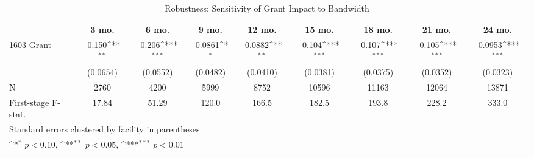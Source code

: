 \begin{table}[htbp]\centering
\def\sym#1{\ifmmode^{#1}\else\(^{#1}\)\fi}
\caption{Robustness: Sensitivity of Grant Impact to Bandwidth\label{RDD:loggenbandwidth}}
\begin{tabular}{l*{8}{c}}
\hline\hline
                    &\multicolumn{1}{c}{3 mo.}&\multicolumn{1}{c}{6 mo.}&\multicolumn{1}{c}{9 mo.}&\multicolumn{1}{c}{12 mo.}&\multicolumn{1}{c}{15 mo.}&\multicolumn{1}{c}{18 mo.}&\multicolumn{1}{c}{21 mo.}&\multicolumn{1}{c}{24 mo.}\\
\hline
1603 Grant          &      -0.150\sym{**} &      -0.206\sym{***}&     -0.0861\sym{*}  &     -0.0882\sym{**} &      -0.104\sym{***}&      -0.107\sym{***}&      -0.105\sym{***}&     -0.0953\sym{***}\\
                    &    (0.0654)         &    (0.0552)         &    (0.0482)         &    (0.0410)         &    (0.0381)         &    (0.0375)         &    (0.0352)         &    (0.0323)         \\
\hline
N                   &        2760         &        4200         &        5999         &        8752         &       10596         &       11163         &       12064         &       13871         \\
First-stage F-stat. &       17.84         &       51.29         &       120.0         &       166.5         &       182.5         &       193.8         &       228.2         &       333.0         \\
\hline\hline
\multicolumn{9}{l}{\footnotesize Standard errors clustered by facility in parentheses.}\\
\multicolumn{9}{l}{\footnotesize \sym{*} \(p<0.10\), \sym{**} \(p<0.05\), \sym{***} \(p<0.01\)}\\
\end{tabular}
\end{table}
